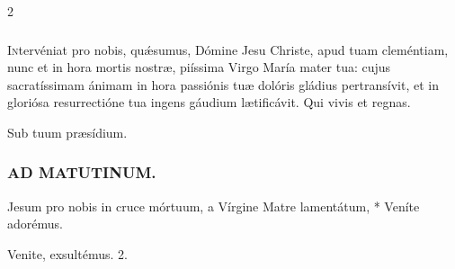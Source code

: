 \documentclass[9pt,twoside]{extarticle}
\begin{document}
\begin{multicols}{2}
\subsubsection*{\center {}}
\lettrine{I}ntervéniat pro nobis, quǽsumus, Dómine Jesu Christe, apud tuam cleméntiam, nunc et in hora mortis nostræ, piíssima Virgo María mater tua: cujus sacratíssimam ánimam in hora passiónis tuæ dolóris gládius pertransívit, et in gloriósa resurrectióne tua ingens gáudium lætificávit. Qui vivis et regnas.

\begin{tightlist}{}
\item {} Sub tuum præsídium.
\end{tightlist}

\subsubsection*{\center \textsc{AD MATUTINUM.}}
\begin{tightlist}{}
\item {} Jesum pro nobis in cruce mórtuum, a Vírgine Matre lamentátum, * Veníte adorémus.
\item {} Venite, exsultémus. 2.
\end{tightlist}


\end{multicols}
\end{document}
